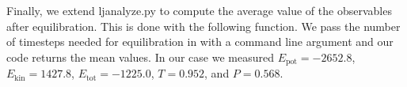 

Finally, we extend ljanalyze.py to compute the average value of the observables after equilibration. This is done with the following function.
We pass the number of timesteps needed for equilibration in with a command line argument and our code returns the mean values.
In our case we measured $E_\mathrm{pot} = -2652.8$, $E_\mathrm{kin} = 1427.8$, $E_\mathrm{tot} = -1225.0$, $T = 0.952$, and $P = 0.568$.

